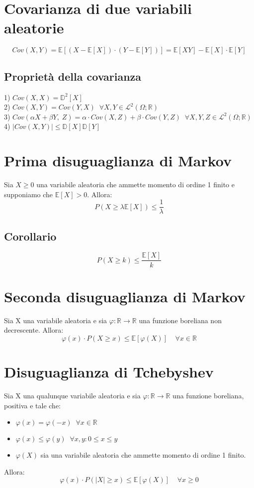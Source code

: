 \documentclass{article}
\begin{document}
\section*{Covarianza di due variabili aleatorie}
\[ Cov(X,Y) = \mathbb{E}[(X - \mathbb{E}[X])\cdot (Y - \mathbb{E}[Y])] = \mathbb{E}[XY] - \mathbb{E}[X]\cdot \mathbb{E}[Y] \]

\subsection*{Proprietà della covarianza}
1) $Cov(X,X) = \mathbb{D}^{2}[X]$\\
2) $Cov(X,Y) = Cov(Y,X) \; \; \forall X,Y \in \mathcal{L}^{2}(\Omega; \mathbb{R})$\\
3) $Cov(\alpha X + \beta Y, \; Z) = \alpha \cdot Cov(X,Z) + \beta \cdot Cov(Y,Z) \; \; \forall X,Y,Z \in \mathcal{L}^{2}(\Omega; \mathbb{R})$\\
4) $|Cov(X,Y)| \leq \mathbb{D}[X] \mathbb{D}[Y]$

\section*{Prima disuguaglianza di Markov}
Sia $X \geq 0$ una variabile aleatoria che ammette momento di ordine 1 finito e supponiamo che $\mathbb{E}[X] > 0$. Allora:
\[ P(X \geq \lambda \mathbb{E}[X]) \leq \frac{1}{\lambda} \]

\subsection*{Corollario}
\[ P(X \geq k) \leq \frac{\mathbb{E}[X]}{k} \]

\section*{Seconda disuguaglianza di Markov}
Sia X una variabile aleatoria e sia $\varphi : \mathbb{R} \to \mathbb{R}$ una funzione boreliana non decrescente. Allora:
\[ \varphi(x)\cdot P(X \geq x) \leq \mathbb{E}[\varphi(X)] \; \; \; \; \forall x \in \mathbb{R} \]

\section*{Disuguaglianza di Tchebyshev}
Sia X una qualunque variabile aleatoria e sia $\varphi : \mathbb{R} \to \mathbb{R}$ una funzione boreliana, positiva e tale che:
\begin{itemize}
\item $\varphi(x) = \varphi(-x) \; \; \forall x \in \mathbb{R}$
\item $\varphi(x) \leq \varphi(y) \; \; \forall x,y : 0 \leq x \leq y$
\item $\varphi(X)$ sia una variabile aleatoria che ammette momento di ordine 1 finito.
\end{itemize}
Allora:
\[ \varphi(x)\cdot P(|X| \geq x) \leq \mathbb{E}[\varphi(X)] \; \; \; \; \forall x \geq 0 \]
\end{document}
